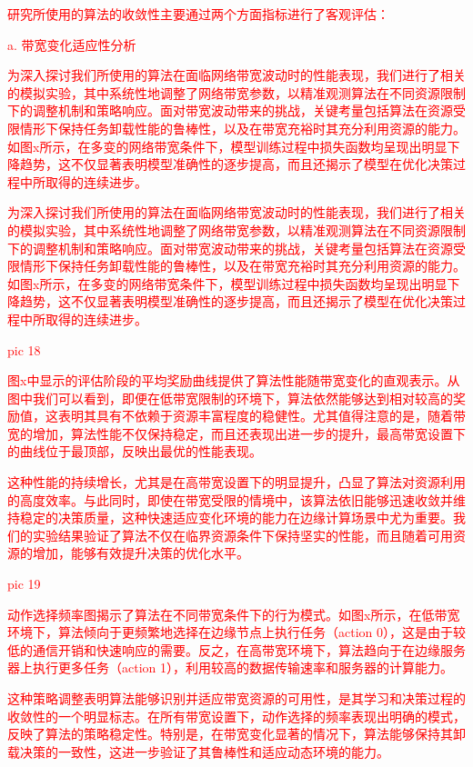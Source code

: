 \documentclass[preprint,12pt]{elsarticle}
\begin{document}
\textcolor{red}{研究所使用的算法的收敛性主要通过两个方面指标进行了客观评估：}

\textcolor{red}{a. 带宽变化适应性分析}

\textcolor{red}{为深入探讨我们所使用的算法在面临网络带宽波动时的性能表现，我们进行了相关的模拟实验，其中系统性地调整了网络带宽参数，以精准观测算法在不同资源限制下的调整机制和策略响应。面对带宽波动带来的挑战，关键考量包括算法在资源受限情形下保持任务卸载性能的鲁棒性，以及在带宽充裕时其充分利用资源的能力。如图x所示，在多变的网络带宽条件下，模型训练过程中损失函数均呈现出明显下降趋势，这不仅显著表明模型准确性的逐步提高，而且还揭示了模型在优化决策过程中所取得的连续进步。}

\textcolor{red}{为深入探讨我们所使用的算法在面临网络带宽波动时的性能表现，我们进行了相关的模拟实验，其中系统性地调整了网络带宽参数，以精准观测算法在不同资源限制下的调整机制和策略响应。面对带宽波动带来的挑战，关键考量包括算法在资源受限情形下保持任务卸载性能的鲁棒性，以及在带宽充裕时其充分利用资源的能力。如图x所示，在多变的网络带宽条件下，模型训练过程中损失函数均呈现出明显下降趋势，这不仅显著表明模型准确性的逐步提高，而且还揭示了模型在优化决策过程中所取得的连续进步。}

\textcolor{red}{pic 18}

\textcolor{red}{图x中显示的评估阶段的平均奖励曲线提供了算法性能随带宽变化的直观表示。从图中我们可以看到，即便在低带宽限制的环境下，算法依然能够达到相对较高的奖励值，这表明其具有不依赖于资源丰富程度的稳健性。尤其值得注意的是，随着带宽的增加，算法性能不仅保持稳定，而且还表现出进一步的提升，最高带宽设置下的曲线位于最顶部，反映出最优的性能表现。}

\textcolor{red}{这种性能的持续增长，尤其是在高带宽设置下的明显提升，凸显了算法对资源利用的高度效率。与此同时，即使在带宽受限的情境中，该算法依旧能够迅速收敛并维持稳定的决策质量，这种快速适应变化环境的能力在边缘计算场景中尤为重要。我们的实验结果验证了算法不仅在临界资源条件下保持坚实的性能，而且随着可用资源的增加，能够有效提升决策的优化水平。}

\textcolor{red}{pic 19}

\textcolor{red}{动作选择频率图揭示了算法在不同带宽条件下的行为模式。如图x所示，在低带宽环境下，算法倾向于更频繁地选择在边缘节点上执行任务（action 0），这是由于较低的通信开销和快速响应的需要。反之，在高带宽环境下，算法趋向于在边缘服务器上执行更多任务（action 1），利用较高的数据传输速率和服务器的计算能力。}

\textcolor{red}{这种策略调整表明算法能够识别并适应带宽资源的可用性，是其学习和决策过程的收敛性的一个明显标志。在所有带宽设置下，动作选择的频率表现出明确的模式，反映了算法的策略稳定性。特别是，在带宽变化显著的情况下，算法能够保持其卸载决策的一致性，这进一步验证了其鲁棒性和适应动态环境的能力。}
\end{document}

